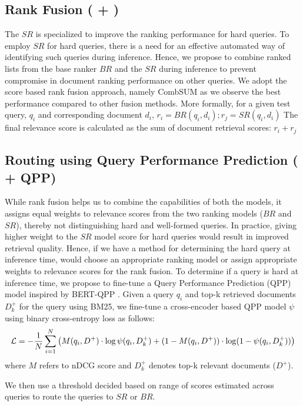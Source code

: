 \subsection{Rank Fusion (\car{} + \rf{})}
\label{method:rank_fusion}
The $SR$ is specialized to improve the ranking performance for hard queries. To employ $SR$ for hard queries, there is a need for an effective automated way of identifying such queries during inference.
Hence, we propose to combine ranked lists from the base ranker $BR$ and the 
$SR$ during inference to prevent compromise in document ranking performance on other queries. We adopt the score based rank fusion approach, namely CombSUM \cite{Fox1993CombinationOM} as we observe the best performance compared to other fusion methods. More formally, for a given test query, $q_i$ and corresponding document $d_i$, 
$r_i = BR(q_i,d_i) ; r_j = SR(q_i,d_i)$
The final relevance score is calculated as the sum of document retrieval scores: $r_i+r_j$
\subsection{ Routing using Query Performance Prediction (\car{} + QPP{})}
\label{method:qpp}
While rank fusion helps us to combine the capabilities of both the models, it assigns equal weights to relevance scores from the two ranking models ($BR$ and $SR$), thereby not distinguishing hard and well-formed queries. In practice, giving higher weight to the $SR$ model score for hard queries would result in improved retrieval quality. Hence, if we have a method for determining the hard query at inference time, would choose an appropriate ranking model or assign appropriate weights to relevance scores for the rank fusion. To determine if a query is hard at inference time, we propose to fine-tune a Query Performance Prediction (QPP) model inspired by BERT-QPP \cite{bert_qpp}. Given a query $q_i$ and top-k retrieved documents $D^+_k$ for the query using BM25, we fine-tune a cross-encoder based QPP model $\psi$  using binary cross-entropy loss as follows:
\[
    \mathcal{L} = -\frac{1}{N} \sum_{i=1}^{N} \left( M(q_i,D^+) \cdot \log  \psi(q_i,D^+_k)  + 
    \\ (1 - M(q_i,D^+)) \cdot \log (1-\psi(q_i,D^+_k)) \right)
\]
where $M$ refers to nDCG score and $D^+_k$ denotes top-k relevant documents ($D^+$).

We then use a threshold decided based on range of scores estimated across queries to route the queries to $SR$ or $BR$. 

